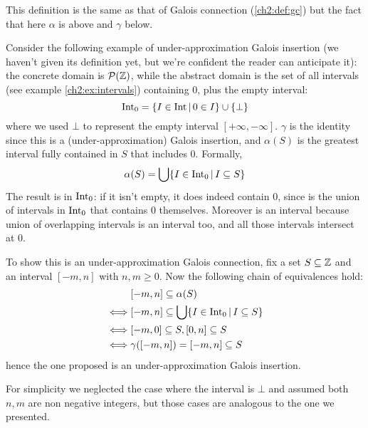 This definition is the same as that of Galois connection (\ref{ch2:def:gc}) but the fact that here $\alpha$ is above and $\gamma$ below.
\begin{example}\label{ch2:ex:intervals-0}
	Consider the following example of under-approximation Galois insertion (we haven't given its definition yet, but we're confident the reader can anticipate it): the concrete domain is $\mathcal{P}(\mathbb{Z})$, while the abstract domain is the set of all intervals (see example \ref{ch2:ex:intervals}) containing $0$, plus the empty interval:
	\[
	\text{Int}_0 = \{ I \in \text{Int} \,\vert\, 0 \in I \} \cup \{ \bot \}
	\]
	where we used $\bot$ to represent the empty interval $[+\infty, -\infty]$.
	$\gamma$ is the identity since this is a (under-approximation) Galois insertion, and $\alpha(S)$ is the greatest interval fully contained in $S$ that includes $0$. Formally,
	\begin{align*}
		\alpha(S) = \bigcup \{ I \in \text{Int}_0 \,\vert\, I \subseteq S \}
	\end{align*}
	The result is in $\text{Int}_0$: if it isn't empty, it does indeed contain $0$, since is the union of intervals in $\text{Int}_0$ that contains $0$ themselves. Moreover is an interval because union of overlapping intervals is an interval too, and all those intervals intersect at $0$.

	To show this is an under-approximation Galois connection, fix a set $S \subseteq \mathbb{Z}$ and an interval $[-m, n]$ with $n, m \ge 0$.
	Now the following chain of equivalences hold:
	\begin{align*}
		&[-m, n] \subseteq \alpha(S) \\
		\iff &[-m, n] \subseteq \bigcup \{ I \in \text{Int}_0 \,\vert\, I \subseteq S \} \\
		\iff &[-m, 0] \subseteq S, [0, n] \subseteq S \\
		\iff &\gamma([-m, n]) = [-m, n] \subseteq S
	\end{align*}
	hence the one proposed is an under-approximation Galois insertion.

	For simplicity we neglected the case where the interval is $\bot$ and assumed both $n, m$ are non negative integers, but those cases are analogous to the one we presented.
\end{example}


